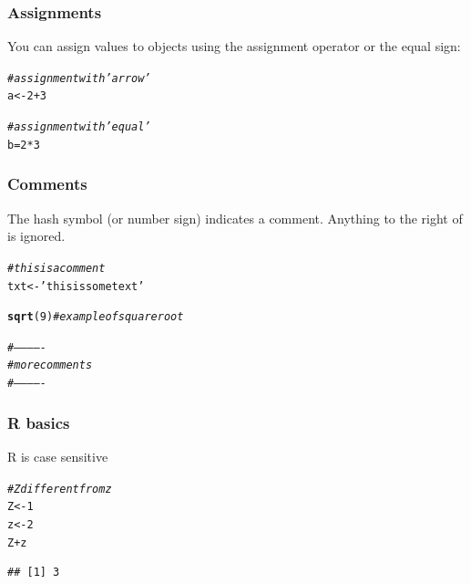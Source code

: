 \documentclass[12pt]{beamer}\usepackage[]{graphicx}\usepackage[]{color}
\makeatletter
\newcommand{\hlnum}[1]{\textcolor[rgb]{0.686,0.059,0.569}{#1}}%
\newcommand{\hlstr}[1]{\textcolor[rgb]{0.192,0.494,0.8}{#1}}%
\newcommand{\hlcom}[1]{\textcolor[rgb]{0.678,0.584,0.686}{\textit{#1}}}%
\newcommand{\hlopt}[1]{\textcolor[rgb]{0,0,0}{#1}}%
\newcommand{\hlstd}[1]{\textcolor[rgb]{0.345,0.345,0.345}{#1}}%
\newcommand{\hlkwb}[1]{\textcolor[rgb]{0.69,0.353,0.396}{#1}}%
\newcommand{\hlkwd}[1]{\textcolor[rgb]{0.737,0.353,0.396}{\textbf{#1}}}%
\newenvironment{kframe}{%
 \def\at@end@of@kframe{}%
 \ifinner\ifhmode%
  \def\at@end@of@kframe{\end{minipage}}%
  \begin{minipage}{\columnwidth}%
 \fi\fi%
 \def\FrameCommand##1{\hskip\@totalleftmargin \hskip-\fboxsep
 \colorbox{shadecolor}{##1}\hskip-\fboxsep
     \hskip-\linewidth \hskip-\@totalleftmargin \hskip\columnwidth}%
 \MakeFramed {\advance\hsize-\width
   \@totalleftmargin\z@ \linewidth\hsize
   \@setminipage}}%
 {\par\unskip\endMakeFramed%
 \at@end@of@kframe}
\newenvironment{knitrout}{}{} %
\makeatother
\begin{document}

\begin{frame}[fragile]
\frametitle{Assignments}
You can assign values to objects using the assignment operator or the equal sign:
\begin{knitrout}\footnotesize
{}\color{fgcolor}\begin{kframe}
\begin{alltt}
\hlcom{# assignment with 'arrow'}
\hlstd{a} \hlkwb{<-} \hlnum{2} \hlopt{+} \hlnum{3}

\hlcom{# assignment with 'equal'}
\hlstd{b} \hlkwb{=} \hlnum{2} \hlopt{*} \hlnum{3}
\end{alltt}
\end{kframe}
\end{knitrout}

\end{frame}


\begin{frame}[fragile]
\frametitle{Comments}

The hash symbol \code{\#} (or number sign) indicates a comment. Anything to the right of \code{\#} is ignored.
\begin{knitrout}\footnotesize
{}\color{fgcolor}\begin{kframe}
\begin{alltt}
\hlcom{# this is a comment}
\hlstd{txt} \hlkwb{<-} \hlstr{'this is some text'}

\hlkwd{sqrt}\hlstd{(}\hlnum{9}\hlstd{)}  \hlcom{# example of square root}

\hlcom{# -------------}
\hlcom{# more comments}
\hlcom{# -------------}
\end{alltt}
\end{kframe}
\end{knitrout}

\end{frame}


\begin{frame}[fragile]
\frametitle{R basics}

R is case sensitive
\begin{knitrout}\footnotesize
{}\color{fgcolor}\begin{kframe}
\begin{alltt}
\hlcom{# Z different from z}
\hlstd{Z} \hlkwb{<-} \hlnum{1}
\hlstd{z} \hlkwb{<-} \hlnum{2}
\hlstd{Z} \hlopt{+} \hlstd{z}
\end{alltt}
\begin{verbatim}
## [1] 3
\end{verbatim}
\end{kframe}
\end{knitrout}

\end{frame}
\end{document}
